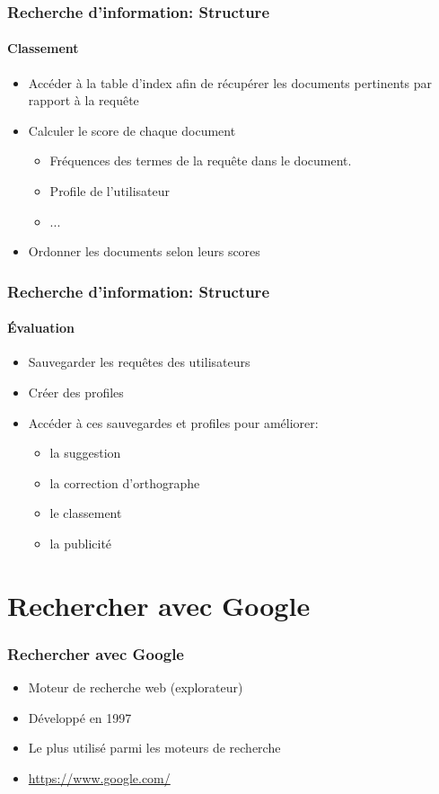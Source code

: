 \documentclass[xcolor=table]{beamer}
\begin{document}
\begin{frame}
\frametitle{Recherche d'information: Structure}
\framesubtitle{Classement}

\begin{itemize}
	\item Accéder à la table d'index afin de récupérer les documents pertinents par rapport à la requête
	\item Calculer le score de chaque document
	\begin{itemize}
		\item Fréquences des termes de la requête dans le document. 
		\item Profile de l'utilisateur 
		\item ...
	\end{itemize}
	\item Ordonner les documents selon leurs scores
\end{itemize}

\end{frame}

\begin{frame}
\frametitle{Recherche d'information: Structure}
\framesubtitle{Évaluation}

\begin{itemize}
	\item Sauvegarder les requêtes des utilisateurs 
	\item Créer des profiles 
	\item Accéder à ces sauvegardes et profiles pour améliorer:
	\begin{itemize}
		\item la suggestion  
		\item la correction d'orthographe 
		\item le classement
		\item la publicité 
	\end{itemize}
\end{itemize}

\end{frame}

\section{Rechercher avec Google}

\begin{frame}
\frametitle{Rechercher avec Google}

\begin{itemize}
	\item Moteur de recherche web (explorateur)
	\item Développé en 1997
	\item Le plus utilisé parmi les moteurs de recherche
	\item \url{https://www.google.com/}
\end{itemize}

\end{frame}
\end{document}
